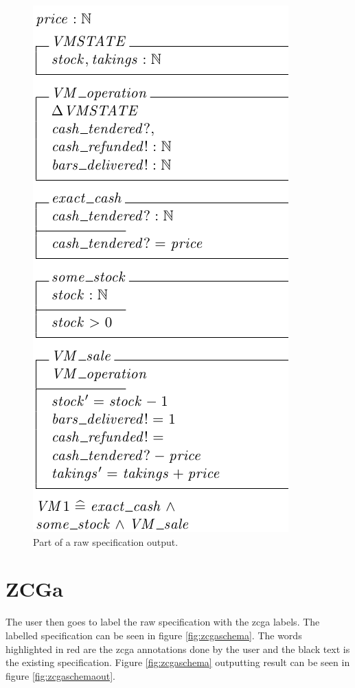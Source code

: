 \begin{figure}[H]
\begin{minipage}{0.45\textwidth}
\includegraphics[scale=0.4]{Figures/fullexample/raw.png}
\vspace{-0.2in}
\caption{Part of a raw specification output. \label{fig:rawschemaout}}
\vspace{-0.2in}
\end{minipage}
\end{figure}


\section{ZCGa}

The user then goes to label the raw specification with the \gls{zcga} labels. The labelled specification can be seen in figure \ref{fig:zcgaschema}. The words highlighted in red are the \gls{zcga} annotations done by the user and the black text is the existing specification. Figure \ref{fig:zcgaschema} outputting result can be seen in figure \ref{fig:zcgaschemaout}.

